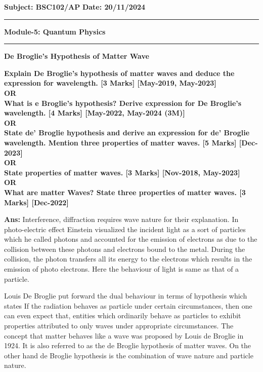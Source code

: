 \documentclass{exam}
\begin{document}
\noindent
\textbf{Subject: BSC102/AP} \hfill { \textbf{Date: 20/11/2024} }\\
\hrule
\begin{center}
\textbf{\large Module-5: Quantum Physics } 
\end{center}
\hrule
\vspace{0.3cm}

\begin{center} \textbf{ \Large De Broglie's Hypothesis of Matter Wave} \end{center}

\begin{questions}

\question \textbf{ Explain De Broglie's hypothesis of matter waves and deduce the expression for wavelength. \hfil
[3 Marks] [May-2019, May-2023]  
\\ OR \\
What is e Broglie's hypothesis? Derive expression for De Broglie's wavelength. \hfil [4 Marks] [May-2022, May-2024 (3M)] 
\\ OR \\
State de' Broglie hypothesis and derive an expression for de' Broglie wavelength. Mention three properties of matter waves. \hfil [5 Marks] [Dec-2023]
\\ OR \\
State properties of matter waves. \hfil [3 Marks] [Nov-2018,  May-2023]
\\ OR \\
	What are matter Waves? State three properties of matter waves. \hfil [3 Marks] [Dec-2022]
}

\textbf{Ans:} Interference, diffraction requires wave nature for their explanation. In photo-electric effect Einstein visualized the incident light as a sort of particles which he called photons and accounted for the emission of electrons as due to the collision between these photons and electrons bound to the metal. During the collision, the photon transfers all its energy to the electrons which results in the emission of photo electrons. Here the behaviour of light is same as that of a particle.

Louis De Broglie put forward the dual behaviour in terms of hypothesis which states If the radiation behaves as particle under certain circumstances, then one can even expect that, entities which ordinarily behave as particles to exhibit properties attributed to only waves under appropriate circumstances. The concept that matter behaves like a wave was proposed by Louis de Broglie in 1924. It is also referred to as the de Broglie hypothesis of matter waves. On the other hand de Broglie hypothesis is the combination of wave nature and particle nature.


\end{questions}
\end{document}
